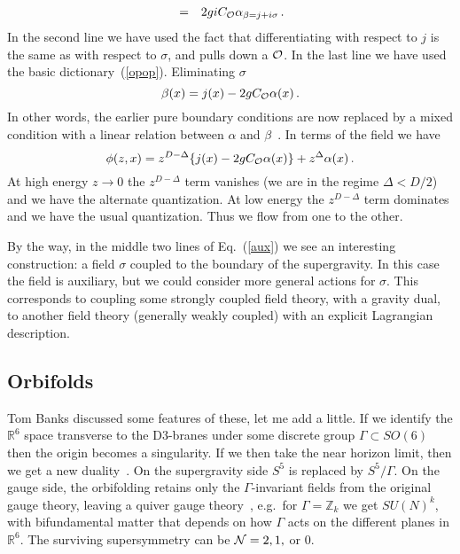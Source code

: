 \documentclass[12pt]{article}
\begin{document}
{\begin{eqnarray}
&=& 2gi C_{\cal O} \alpha_{\beta=j +i\sigma} \,.
\end{eqnarray}
In the second line we have used the fact that differentiating with respect to $j$ is the same as with respect to $\sigma$, and pulls down a $\cal O$.  In the last line we have used the basic dictionary~(\ref{opop}).  Eliminating $\sigma$
\begin{equation}
\beta(x) = j(x) - 2g C_{\cal O} \alpha(x) \,.
\end{equation}
In other words, the earlier pure boundary conditions are now replaced by a mixed condition with a linear relation between $\alpha$ and $\beta$~\cite{Witten:2001ua,Berkooz:2002ug}.  In terms of the field we have
\begin{equation}
\phi(z,x) = z^{D-\Delta} \{ j(x) - 2g C_{\cal O} \alpha(x) \} + z^{\Delta} \alpha(x)   \,.
\end{equation}
At high energy $z \to 0$ the $z^{D-\Delta}$ term vanishes (we are in the regime $\Delta <  D/2$) and we have the alternate quantization.  At low energy the $z^{D-\Delta}$ term dominates and we have the usual quantization.  Thus we flow from one to the other.

By the way, in the middle two lines of Eq.~(\ref{aux}) we see an interesting construction: a field $\sigma$ coupled to the boundary of the supergravity.  In this case the field is auxiliary, but we could consider more general actions for $\sigma$.  This corresponds to coupling some strongly coupled field theory, with a gravity dual, to another field theory (generally weakly coupled) with an explicit Lagrangian description.

\subsection{Orbifolds}

Tom Banks discussed some features of these, let me add a little.  If we identify the ${\mathbb R}^6$ space transverse to the D3-branes under some discrete group $\Gamma \subset SO(6)$ then the origin becomes a singularity.  If we then take the near horizon limit, then we get a new duality~\cite{Kachru:1998ys}. On the supergravity side $S^5$ is replaced by $S^5/\Gamma$.  On the gauge side, the orbifolding retains only the $\Gamma$-invariant fields from the original gauge theory, leaving a quiver gauge theory~\cite{Douglas:1996sw}, e.g.~for $\Gamma={\mathbb Z}_k$ we get $SU(N)^k$, with bifundamental matter that depends on how $\Gamma$ acts on the different planes in ${\mathbb R}^6$.  The surviving supersymmetry can be ${\cal N} = 2, 1,$ or 0.

}
\end{document}
